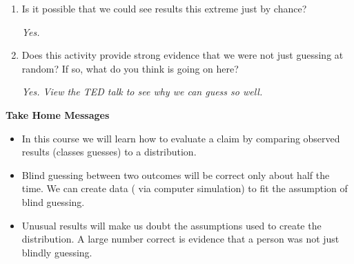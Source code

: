 \begin{enumerate}
\begin{enumerate}
\item  How unusual are the classes   answers relative to the ``just guessing'' spinner results?
\begin{students}
  \vspace{2cm}
\end{students}    
\begin{key}
   {\it Way out in the tail, I hope.}
\end{key}
\end{enumerate}
\item  Is it possible that we could see results this extreme just by
  chance?
\begin{students}
  \vspace{2cm}
\end{students}    
\begin{key}
   {\it Yes.}
\end{key}

\item Does this activity provide strong evidence that we were not just
  guessing at random?  If so, what do you think is going on here?
\begin{students}
  \vspace{2cm}
\end{students}    
\begin{key}
   {\it  Yes. View the TED talk to see why we can guess so well.}
\end{key}
  
\end{enumerate}


\begin{center}
  {\bf Take Home Messages}
\end{center}
  \begin{itemize}
  \item In this course we will learn how to evaluate a claim by
    comparing observed results (classes guesses) to a distribution.

  \item Blind guessing between two outcomes will be correct only
    about half the time. We can create data ( via computer simulation)
    to fit the assumption of blind guessing.

  \item Unusual results will make us doubt the assumptions used to
    create the distribution.  A large number correct is evidence that
    a person was not just blindly guessing.
  \end{itemize} \vspace{\fill}

